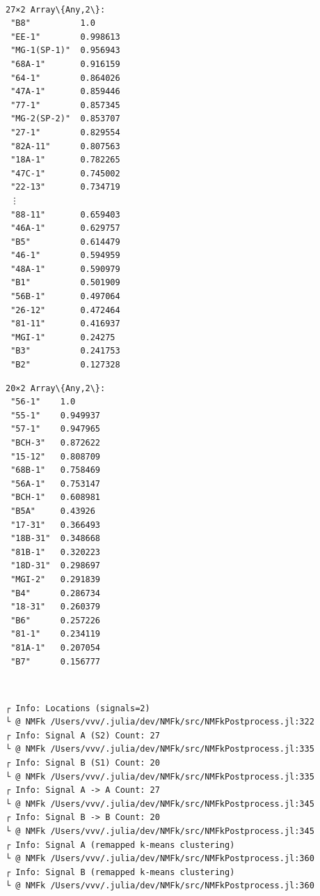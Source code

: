 \documentclass[11pt]{article}
\begin{document}
    \begin{center}
    \end{center}
    { \hspace*{\fill} \\}


    \begin{Verbatim}[commandchars=\\\{\}]
27×2 Array\{Any,2\}:
 "B8"          1.0
 "EE-1"        0.998613
 "MG-1(SP-1)"  0.956943
 "68A-1"       0.916159
 "64-1"        0.864026
 "47A-1"       0.859446
 "77-1"        0.857345
 "MG-2(SP-2)"  0.853707
 "27-1"        0.829554
 "82A-11"      0.807563
 "18A-1"       0.782265
 "47C-1"       0.745002
 "22-13"       0.734719
 ⋮
 "88-11"       0.659403
 "46A-1"       0.629757
 "B5"          0.614479
 "46-1"        0.594959
 "48A-1"       0.590979
 "B1"          0.501909
 "56B-1"       0.497064
 "26-12"       0.472464
 "81-11"       0.416937
 "MGI-1"       0.24275
 "B3"          0.241753
 "B2"          0.127328
    \end{Verbatim}



    \begin{Verbatim}[commandchars=\\\{\}]
20×2 Array\{Any,2\}:
 "56-1"    1.0
 "55-1"    0.949937
 "57-1"    0.947965
 "BCH-3"   0.872622
 "15-12"   0.808709
 "68B-1"   0.758469
 "56A-1"   0.753147
 "BCH-1"   0.608981
 "B5A"     0.43926
 "17-31"   0.366493
 "18B-31"  0.348668
 "81B-1"   0.320223
 "18D-31"  0.298697
 "MGI-2"   0.291839
 "B4"      0.286734
 "18-31"   0.260379
 "B6"      0.257226
 "81-1"    0.234119
 "81A-1"   0.207054
 "B7"      0.156777
    \end{Verbatim}


    \begin{center}
    \end{center}
    { \hspace*{\fill} \\}

    \begin{Verbatim}[commandchars=\\\{\}]
┌ Info: Locations (signals=2)
└ @ NMFk /Users/vvv/.julia/dev/NMFk/src/NMFkPostprocess.jl:322
┌ Info: Signal A (S2) Count: 27
└ @ NMFk /Users/vvv/.julia/dev/NMFk/src/NMFkPostprocess.jl:335
┌ Info: Signal B (S1) Count: 20
└ @ NMFk /Users/vvv/.julia/dev/NMFk/src/NMFkPostprocess.jl:335
┌ Info: Signal A -> A Count: 27
└ @ NMFk /Users/vvv/.julia/dev/NMFk/src/NMFkPostprocess.jl:345
┌ Info: Signal B -> B Count: 20
└ @ NMFk /Users/vvv/.julia/dev/NMFk/src/NMFkPostprocess.jl:345
┌ Info: Signal A (remapped k-means clustering)
└ @ NMFk /Users/vvv/.julia/dev/NMFk/src/NMFkPostprocess.jl:360
┌ Info: Signal B (remapped k-means clustering)
└ @ NMFk /Users/vvv/.julia/dev/NMFk/src/NMFkPostprocess.jl:360
    \end{Verbatim}
\end{document}
